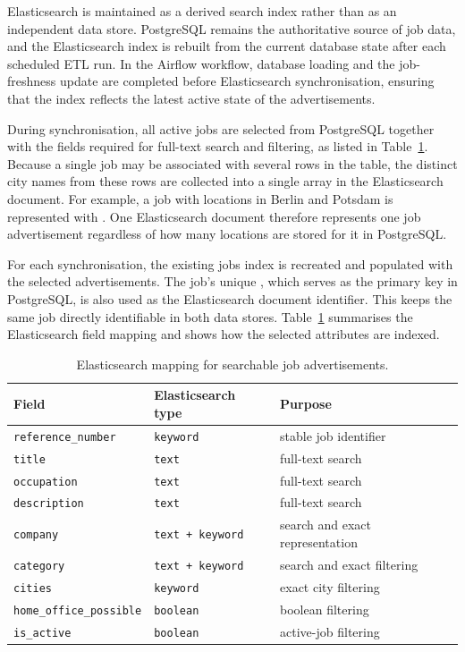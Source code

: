 \documentclass[11pt,a4paper]{article}
\begin{document}
Elasticsearch is maintained as a derived search index rather than as an independent data store. PostgreSQL remains the authoritative source of job data, and the Elasticsearch index is rebuilt from the current database state after each scheduled ETL run. In the Airflow workflow, database loading and the job-freshness update are completed before Elasticsearch synchronisation, ensuring that the index reflects the latest active state of the advertisements.

During synchronisation, all active jobs are selected from PostgreSQL together with the fields required for full-text search and filtering, as listed in Table~\ref{tab:elasticsearch-mapping}. Because a single job may be associated with several rows in the  table, the distinct city names from these rows are collected into a single  array in the Elasticsearch document. For example, a job with locations in Berlin and Potsdam is represented with . One Elasticsearch document therefore represents one job advertisement regardless of how many locations are stored for it in PostgreSQL.

For each synchronisation, the existing jobs index is recreated and populated with the selected advertisements. The job's unique , which serves as the primary key in PostgreSQL, is also used as the Elasticsearch document identifier. This keeps the same job directly identifiable in both data stores. Table~\ref{tab:elasticsearch-mapping} summarises the Elasticsearch field mapping and shows how the selected attributes are indexed.

\begin{table}[htbp]
	\centering
	\begin{tabular}{lll}
		\hline
		\textbf{Field} & \textbf{Elasticsearch type} & \textbf{Purpose} \\
		\hline
		\texttt{reference\_number}     & \texttt{keyword}        & stable job identifier \\
		\texttt{title}                 & \texttt{text}           & full-text search \\
		\texttt{occupation}            & \texttt{text}           & full-text search \\
		\texttt{description}           & \texttt{text}           & full-text search \\
		\texttt{company}               & \texttt{text + keyword} & search and exact representation \\
		\texttt{category}              & \texttt{text + keyword} & search and exact filtering \\
		\texttt{cities}                & \texttt{keyword}        & exact city filtering \\
		\texttt{home\_office\_possible}& \texttt{boolean}        & boolean filtering \\
		\texttt{is\_active}            & \texttt{boolean}        & active-job filtering \\
		\hline
	\end{tabular}
	\caption{Elasticsearch mapping for searchable job advertisements.}
	\label{tab:elasticsearch-mapping}
\end{table}
\end{document}
